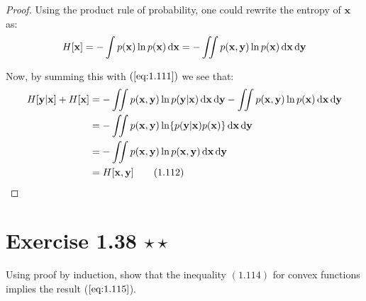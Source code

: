 \begin{proof}
    Using the product rule of probability, one could rewrite the entropy of $\mathbf{x}$ as:
    \[
        H[\mathbf{x}] 
        = -\int p(\mathbf{x}) \ln p(\mathbf{x}) \mathop{}\!\mathrm{d} \mathbf{x}
        = -\iint p(\mathbf{x}, \mathbf{y}) \ln p(\mathbf{x}) \mathop{}\!\mathrm{d} \mathbf{x} \mathop{}\!\mathrm{d} \mathbf{y}
    \] 

    Now, by summing this with $(\ref{eq:1.111})$ we see that:
    \begin{align*}
         H[\mathbf{y} | \mathbf{x}] + H[\mathbf{x}]
        &= -\iint p(\mathbf{x}, \mathbf{y}) \ln p(\mathbf{y} | \mathbf{x}) \diff \mathbf{x} \diff \mathbf{y}
        -\iint p(\mathbf{x}, \mathbf{y}) \ln p(\mathbf{x}) \diff \mathbf{x} \diff \mathbf{y} \\
        &= -\iint p(\mathbf{x}, \mathbf{y}) \ln \{p(\mathbf{y} | \mathbf{x})p(\mathbf{x})\} \diff \mathbf{x} \diff \mathbf{y} \\
        &= -\iint p(\mathbf{x}, \mathbf{y}) \ln p(\mathbf{x}, \mathbf{y}) \diff \mathbf{x} \diff \mathbf{y} \\
        &= H[\mathbf{x}, \mathbf{y}] \tag{1.112}
    \end{align*}
\end{proof}

\section*{Exercise 1.38 $\star \star$}
Using proof by induction, show that the inequality $(1.114)$ for
convex functions implies the result ($\ref{eq:1.115}$).

\vspace{1em}

